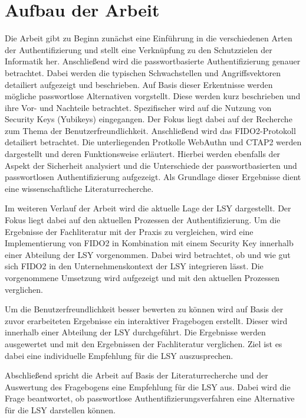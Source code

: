 \section{Aufbau der Arbeit}
Die Arbeit gibt zu Beginn zunächst eine Einführung in die verschiedenen Arten der Authentifizierung und stellt eine Verknüpfung zu den Schutzzielen der Informatik her. Anschließend wird die passwortbasierte Authentifizierung genauer betrachtet. Dabei werden die typischen Schwachstellen und Angriffsvektoren detailiert aufgezeigt und beschrieben. Auf Basis dieser Erkentnisse werden mögliche passwortlose Alternativen vorgstellt. Diese werden kurz beschrieben und ihre Vor- und Nachteile betrachtet. Spezifischer wird auf die Nutzung von Security Keys (Yubikeys) eingegangen. Der Fokus liegt dabei auf der Recherche zum Thema der Benutzerfreundlichkeit. Anschließend wird das \ac{FIDO}2-Protokoll detailiert betrachtet. Die unterliegenden Protkolle WebAuthn und \ac{CTAP2} werden dargestellt und deren Funktionsweise erläutert. Hierbei werden ebenfalls der Aspekt der Sicherheit analysiert und die Unterschiede der passwortbasierten und passwortlosen Authentifizierung aufgezeigt. Als Grundlage dieser Ergebnisse dient eine wissenschaftliche Literaturrecherche.

Im weiteren Verlauf der Arbeit wird die aktuelle Lage der \ac{LSY} dargestellt. Der Fokus liegt dabei auf den aktuellen Prozessen der Authentifizierung. Um die Ergebnisse der Fachliteratur mit der Praxis zu vergleichen, wird eine Implementierung von \ac{FIDO}2 in Kombination mit einem Security Key innerhalb einer Abteilung der \ac{LSY} vorgenommen. Dabei wird betrachtet, ob und wie gut sich \ac{FIDO}2 in den Unternehmenskontext der \ac{LSY} integrieren lässt. Die vorgenommene Umsetzung wird aufgezeigt und mit den aktuellen Prozessen verglichen.

Um die Benutzerfreundlichkeit besser bewerten zu können wird auf Basis der zuvor erarbeiteten Ergebnisse ein interaktiver Fragebogen erstellt. Dieser wird innerhalb einer Abteilung der \ac{LSY} durchgeführt. Die Ergebnisse werden ausgewertet und mit den Ergebnissen der Fachliteratur verglichen. Ziel ist es dabei eine individuelle Empfehlung für die \ac{LSY} auszusprechen.

Abschließend spricht die Arbeit auf Basis der Literaturrecherche und der Auswertung des Fragebogens eine Empfehlung für die \ac{LSY} aus. Dabei wird die Frage beantwortet, ob passwortlose Authentifizierungsverfahren eine Alternative für die \ac{LSY} darstellen können.

